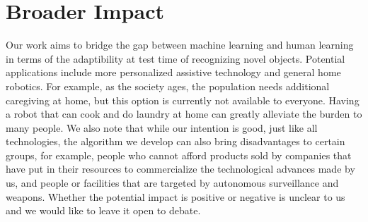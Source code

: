 \section*{Broader Impact}
\vspace{-0.1in}
Our work aims to bridge the gap between machine learning and human learning in terms of the
adaptibility at test time of recognizing novel objects. Potential applications include more
personalized assistive technology and general home robotics. For example, as the society ages, the
population needs additional caregiving at home, but this option is currently not available to
everyone. Having a robot that can cook and do laundry at home can greatly alleviate the burden to
many people. We also note that while our intention is good, just like all technologies, the
algorithm we develop can also bring disadvantages to certain groups, for example, people who cannot
afford products sold by companies that have put in their resources to commercialize the
technological advances made by us, and people or facilities that are targeted by autonomous
surveillance and weapons. Whether the potential impact is positive or negative is unclear to us and
we would like to leave it open to debate.